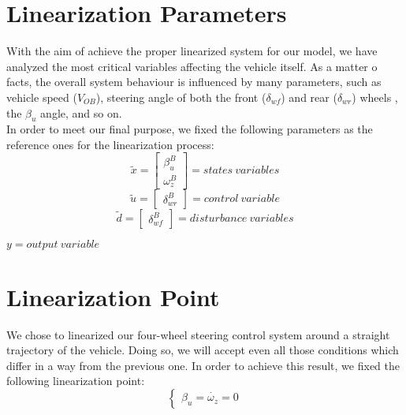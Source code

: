 \documentclass[a4paper,12pt,titlepage]{report}
\numberwithin{figure}{section}
\begin{document}
\section{Linearization Parameters} 
	With the aim of achieve the proper linearized system for our model, we have analyzed the most critical variables affecting the vehicle itself. As a matter o facts, the overall system behaviour is influenced by many parameters, such as vehicle speed ($V_{OB}$), steering angle of both the front ($\delta_{wf}$) and rear ($\delta_{wr}$) wheels , the $\beta_{u}$ angle, and so on. \\
	In order to meet our final purpose, we fixed the following parameters as the reference ones for the linearization process:\\
		\begin{equation*}
			\tilde{x} =
			\begin{bmatrix}
			\beta_{u}^{B} \\\omega_{z}^{B}
			\end{bmatrix} = states \ variables
		\end{equation*}\quad
		\begin{equation*} 
			\tilde{u} =
			\begin{bmatrix}
			\delta_{wr}^{B} 
			\end{bmatrix} = control \ variable
		\end{equation*}\quad
		\begin{equation*} 
			\tilde{d} =
			\begin{bmatrix}
			\delta_{wf}^{B} 
			\end{bmatrix} = disturbance \ variables
		\end{equation*}
		\begin{center}
			$ y = output \ variable $	
		\end{center}
\section{Linearization Point} 
	We chose to linearized our four-wheel steering control system around a straight trajectory of the vehicle. Doing so, we will accept even all those conditions which differ in a way from the previous one. In order to achieve this result, we fixed the following linearization point:
		\begin{equation*}
			\begin{cases}
				\beta_{u} = \dot{\omega_{z}} = 0
			\end{cases}
		\end{equation*}
\end{document}

